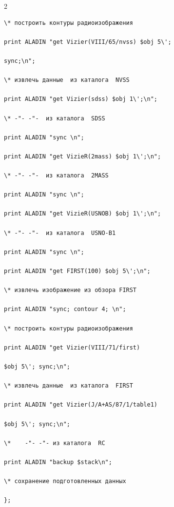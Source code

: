 \begin{multicols}{2}
{\begin{verbatim}
\* построить контуры радиоизображения

print ALADIN "get Vizier(VIII/65/nvss) $obj 5\'; 

sync;\n";

\* извлечь данные  из каталога  NVSS

print ALADIN "get Vizier(sdss) $obj 1\';\n";              

\* -"- -"-  из каталога  SDSS

print ALADIN "sync \n";

print ALADIN "get VizieR(2mass) $obj 1\';\n";             

\* -"- -"-  из каталога  2MASS

print ALADIN "sync \n";

print ALADIN "get VizieR(USNOB) $obj 1\';\n";             

\* -"- -"-  из каталога  USNO-B1

print ALADIN "sync \n";

print ALADIN "get FIRST(100) $obj 5\';\n";                

\* извлечь изображение из обзора FIRST

print ALADIN "sync; contour 4; \n";                       

\* построить контуры радиоизображения

print ALADIN "get Vizier(VIII/71/first) 

$obj 5\'; sync;\n"; 

\* извлечь данные  из каталога  FIRST

print ALADIN "get Vizier(J/A+AS/87/1/table1) 

$obj 5\'; sync;\n"; 

\*    -"- -"- из каталога  RC

print ALADIN "backup $stack\n";                             

\* сохранение подготовленных данных

};

\end{verbatim}



}









\begin{figure}[b] %


\end{figure}
\end{multicols}
